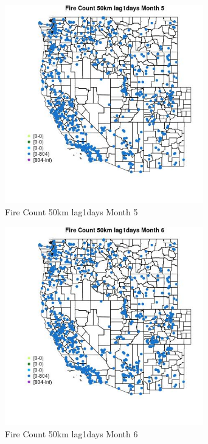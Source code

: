 \begin{figure} 
\centering  
\includegraphics[width=0.77\textwidth]{Code_Outputs/Report_ML_input_PM25_Step4_part_f_de_duplicated_aveswNAs_MapObsMo5Fire_Count_50km_lag1days.jpg} 
\caption{\label{fig:Report_ML_input_PM25_Step4_part_f_de_duplicated_aveswNAsMapObsMo5Fire_Count_50km_lag1days}Fire Count 50km lag1days Month 5} 
\end{figure} 
 

\begin{figure} 
\centering  
\includegraphics[width=0.77\textwidth]{Code_Outputs/Report_ML_input_PM25_Step4_part_f_de_duplicated_aveswNAs_MapObsMo6Fire_Count_50km_lag1days.jpg} 
\caption{\label{fig:Report_ML_input_PM25_Step4_part_f_de_duplicated_aveswNAsMapObsMo6Fire_Count_50km_lag1days}Fire Count 50km lag1days Month 6} 
\end{figure} 
 

